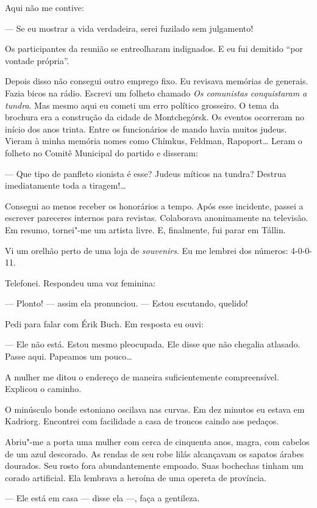 Aqui não me contive:

--- Se eu mostrar a vida verdadeira, serei fuzilado sem julgamento!

Os participantes da reunião se entreolharam indignados. E eu fui
demitido ``por vontade própria''.

Depois disso não consegui outro emprego fixo. Eu revisava memórias de
generais. Fazia bicos na rádio. Escrevi um folheto chamado \emph{Os
comunistas conquistaram a tundra}. Mas mesmo aqui eu cometi um erro
político grosseiro. O tema da brochura era a construção da cidade de
Montchegórsk. Os eventos ocorreram no início dos anos trinta. Entre os
funcionários de mando havia muitos judeus. Vieram à minha memória
nomes como Chímkus, Feldman, Rapoport\ldots{} Leram o folheto no Comitê
Municipal do partido e disseram:

--- Que tipo de panfleto sionista é esse? Judeus míticos na tundra?
Destrua imediatamente toda a tiragem!\ldots{}

Consegui ao menos receber os honorários a tempo. Após esse incidente,
passei a escrever pareceres internos para revistas. Colaborava
anonimamente na televisão. Em resumo, tornei"-me um artista livre. E,
finalmente, fui parar em Tállin.

Vi um orelhão perto de uma loja de \emph{souvenirs}. Eu me lembrei dos
números: 4-0-0-11.

Telefonei. Respondeu uma voz feminina:

--- Plonto! --- assim ela pronunciou. --- Estou escutando, quelido!

Pedi para falar com Érik Buch. Em resposta eu ouvi:

--- Ele não está. Estou mesmo pleocupada. Ele disse que não chegalia
atlasado. Passe aqui. Papeamos um pouco\ldots{}

A mulher me ditou o endereço de maneira suficientemente compreensível.
Explicou o caminho.

O minúsculo bonde estoniano oscilava nas curvas. Em dez minutos eu
estava em Kadriorg. Encontrei com facilidade a casa de troncos caindo
aos pedaços.

Abriu"-me a porta uma mulher com cerca de cinquenta anos, magra, com
cabelos de um azul descorado. As rendas de seu robe lilás alcançavam os
sapatos árabes dourados. Seu rosto fora abundantemente empoado. Suas
bochechas tinham um corado artificial. Ela lembrava a heroína de uma
opereta de província.

--- Ele está em casa --- disse ela ---, faça a gentileza.


